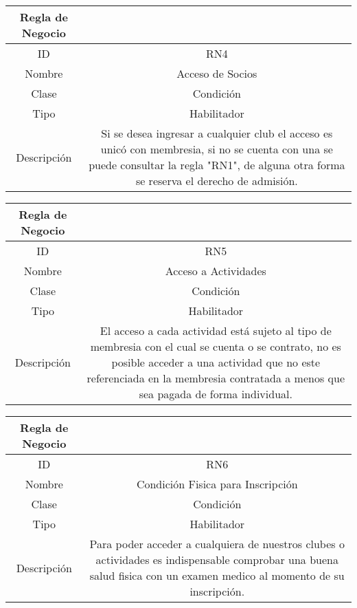 \documentclass{article}
\begin{document}
\begin{center}
\begin{tabular}{ |c|c| } 
 \hline
 Regla de Negocio & \\
 \hline
 ID & RN4 \\ 
  \hline
  Nombre & Acceso de Socios\\ 
  \hline
  Clase & Condición\\ 
  \hline
  Tipo & Habilitador\\ 
  \hline
  Descripción & Si se desea ingresar a cualquier club el acceso es unicó con membresia, si no se cuenta con una se puede consultar la regla "RN1", de alguna otra forma se reserva el derecho de admisión.\\ 
   \hline
 \hline
\end{tabular}
\end{center}

\begin{center}
\begin{tabular}{ |c|c| } 
 \hline
 Regla de Negocio & \\
 \hline
 ID & RN5 \\ 
  \hline
  Nombre & Acceso a Actividades\\ 
  \hline
  Clase & Condición\\ 
  \hline
  Tipo & Habilitador\\ 
  \hline
  Descripción & El acceso a cada actividad está sujeto al tipo de membresia con el cual se cuenta o se contrato, no es posible acceder a una actividad que no este referenciada en la membresia contratada a menos que sea pagada de forma individual.\\ 
   \hline
 \hline
\end{tabular}
\end{center}

\begin{center}
\begin{tabular}{ |c|c| } 
 \hline
 Regla de Negocio & \\
 \hline
 ID & RN6 \\ 
  \hline
  Nombre & Condición Fisica para Inscripción\\ 
  \hline
  Clase & Condición\\ 
  \hline
  Tipo & Habilitador\\ 
  \hline
  Descripción & Para poder acceder a cualquiera de nuestros clubes o actividades es indispensable comprobar una buena salud fisica con un examen medico al momento de su inscripción.\\ 
   \hline
 \hline
\end{tabular}
\end{center}
\end{document}
